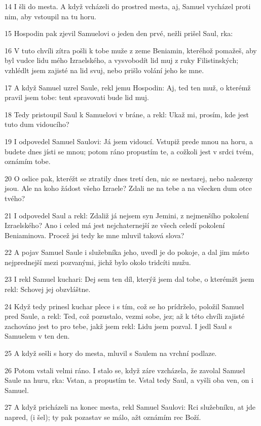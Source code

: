 \par 14 I šli do mesta. A když vcházeli do prostred mesta, aj, Samuel vycházel proti nim, aby vstoupil na tu horu.
\par 15 Hospodin pak zjevil Samuelovi o jeden den prvé, nežli prišel Saul, rka:
\par 16 V tuto chvíli zítra pošli k tobe muže z zeme Beniamin, kteréhož pomažeš, aby byl vudce lidu mého Izraelského, a vysvobodít lid muj z ruky Filistinských; vzhlédlt jsem zajisté na lid svuj, nebo prišlo volání jeho ke mne.
\par 17 A když Samuel uzrel Saule, rekl jemu Hospodin: Aj, ted ten muž, o kterémž pravil jsem tobe: tent spravovati bude lid muj.
\par 18 Tedy pristoupil Saul k Samuelovi v bráne, a rekl: Ukaž mi, prosím, kde jest tuto dum vidoucího?
\par 19 I odpovedel Samuel Saulovi: Já jsem vidoucí. Vstupiž prede mnou na horu, a budete dnes jísti se mnou; potom ráno propustím te, a cožkoli jest v srdci tvém, oznámím tobe.
\par 20 O oslice pak, kteréžt se ztratily dnes tretí den, nic se nestarej, nebo nalezeny jsou. Ale na koho žádost všeho Izraele? Zdali ne na tebe a na všecken dum otce tvého?
\par 21 I odpovedel Saul a rekl: Zdaliž já nejsem syn Jemini, z nejmenšího pokolení Izraelského? Ano i celed má jest nejchaternejší ze všech celedí pokolení Beniaminova. Procež jsi tedy ke mne mluvil taková slova?
\par 22 A pojav Samuel Saule i služebníka jeho, uvedl je do pokoje, a dal jim místo nejprednejší mezi pozvanými, jichž bylo okolo tridcíti mužu.
\par 23 I rekl Samuel kuchari: Dej sem ten díl, kterýž jsem dal tobe, o kterémžt jsem rekl: Schovej jej obzvláštne.
\par 24 Když tedy prinesl kuchar plece i s tím, což se ho prídrželo, položil Samuel pred Saule, a rekl: Ted, což pozustalo, vezmi sobe, jez; až k této chvíli zajisté zachováno jest to pro tebe, jakž jsem rekl: Lidu jsem pozval. I jedl Saul s Samuelem v ten den.
\par 25 A když sešli s hory do mesta, mluvil s Saulem na vrchní podlaze.
\par 26 Potom vstali velmi ráno. I stalo se, když záre vzcházela, že zavolal Samuel Saule na huru, rka: Vstan, a propustím te. Vstal tedy Saul, a vyšli oba ven, on i Samuel.
\par 27 A když pricházeli na konec mesta, rekl Samuel Saulovi: Rci služebníku, at jde napred, (i šel); ty pak pozastav se málo, ažt oznámím rec Boží.

